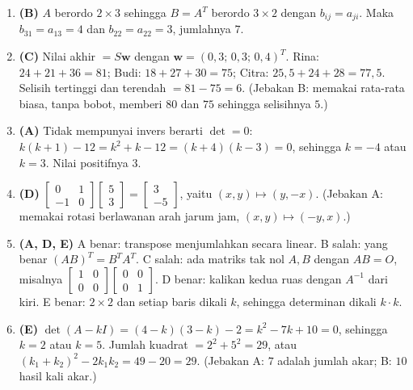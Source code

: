 \documentclass[a4paper,11pt]{article}
\newcommand{\sm}[1]{\left[\begin{smallmatrix}#1\end{smallmatrix}\right]}
\newcounter{no}
\begin{document}
\small\begin{enumerate}[leftmargin=2em,itemsep=2pt,topsep=2pt]
\item[\textbf{1.}] \textbf{(B)} $A$ berordo $2\times3$ sehingga $B=A^T$ berordo $3\times2$ dengan $b_{ij}=a_{ji}$. Maka $b_{31}=a_{13}=4$ dan $b_{22}=a_{22}=3$, jumlahnya $7$.
\item[\textbf{2.}] \textbf{(C)} Nilai akhir $=S\mathbf{w}$ dengan $\mathbf{w}=(0{,}3;\,0{,}3;\,0{,}4)^T$. Rina: $24+21+36=81$; Budi: $18+27+30=75$; Citra: $25{,}5+24+28=77{,}5$. Selisih tertinggi dan terendah $=81-75=6$. (Jebakan B: memakai rata-rata biasa, tanpa bobot, memberi $80$ dan $75$ sehingga selisihnya $5$.)
\item[\textbf{3.}] \textbf{(A)} Tidak mempunyai invers berarti $\det=0$: $k(k+1)-12=k^2+k-12=(k+4)(k-3)=0$, sehingga $k=-4$ atau $k=3$. Nilai positifnya $3$.
\item[\textbf{4.}] \textbf{(D)} $\begin{bmatrix}0&1\\-1&0\end{bmatrix}\begin{bmatrix}5\\3\end{bmatrix}=\begin{bmatrix}3\\-5\end{bmatrix}$, yaitu $(x,y)\mapsto(y,-x)$. (Jebakan A: memakai rotasi berlawanan arah jarum jam, $(x,y)\mapsto(-y,x)$.)
\item[\textbf{5.}] \textbf{(A, D, E)} A benar: transpose menjumlahkan secara linear. B salah: yang benar $(AB)^T=B^TA^T$. C salah: ada matriks tak nol $A,B$ dengan $AB=O$, misalnya $\sm{1&0\\0&0}\sm{0&0\\0&1}$. D benar: kalikan kedua ruas dengan $A^{-1}$ dari kiri. E benar: $2\times2$ dan setiap baris dikali $k$, sehingga determinan dikali $k\cdot k$.
\item[\textbf{6.}] \textbf{(E)} $\det(A-kI)=(4-k)(3-k)-2=k^2-7k+10=0$, sehingga $k=2$ atau $k=5$. Jumlah kuadrat $=2^2+5^2=29$, atau $(k_1+k_2)^2-2k_1k_2=49-20=29$. (Jebakan A: $7$ adalah jumlah akar; B: $10$ hasil kali akar.)

\end{enumerate}
\end{document}
